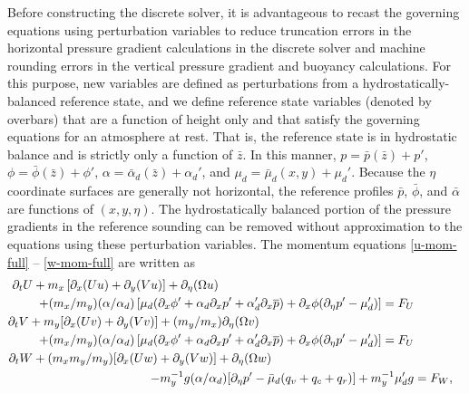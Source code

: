 Before constructing the discrete solver, it is advantageous to recast
the governing equations using perturbation variables to reduce
truncation errors in the horizontal pressure gradient calculations in
the discrete solver and machine rounding errors in
the vertical pressure gradient and buoyancy calculations.  
For this purpose, new
variables are defined as perturbations from a hydrostatically-balanced 
reference state, and we define reference state
variables (denoted by overbars) that are a function of height only and
that satisfy the governing equations for an atmosphere at rest.  That is,
the reference state is in hydrostatic balance and is strictly only a
function of $\bar z$.  In this manner, $p=\bar p(\bar z)+p'$, $\phi=\bar
\phi(\bar z)
+\phi'$, $\alpha=\bar \alpha_d(\bar z) +\alpha_d'$, and $\mu_d = \bar\mu_d(x,y) +
\mu_d'$. Because the $\eta$ coordinate surfaces are generally not
horizontal, the reference profiles $\bar p$, $\bar\phi$, and
$\bar\alpha$ are functions of $(x,y,\eta)$. 
The hydrostatically balanced portion of the pressure gradients in the
reference sounding can be removed without approximation to the equations
using these perturbation variables.
The momentum equations 
\eqref{u-mom-full} -- \eqref{w-mom-full} are written as
%
\begin{align}
\partial_t U + m_x\left[\partial_x(Uu) + \partial_y(Vu)\right] + \partial_\eta (\Omega u) ~~~~~~~~ ~~~~~~~~ ~~~~~~~~ ~~~~~~~~ ~~~~~~~ ~~~~~~~ ~~ \notag &
\hphantom{(m_y/m_x)}
\\
+(m_x/m_y) (\alpha/\alpha_d) \left[ \mu_d (\partial_x \phi' + \alpha_d \partial_x p' + \alpha'_d \partial_x \overline{p}) +
\partial_x \phi (\partial_\eta p' - \mu'_d)\right]  = F_U
\label{u-mom-pert}
\\
%
\partial_t V + m_y[\partial_x (Uv) + \partial_y (Vv)] + (m_y/m_x) \partial_\eta (\Omega v) ~~~~~~~~ ~~~~~~~~ ~~~~~~~~ ~~~~~~~~ ~~~~~~ \notag &
\\
+(m_x/m_y) (\alpha/\alpha_d) \left[ \mu_d (\partial_x \phi' + \alpha_d \partial_x p' + \alpha'_d \partial_x \overline{p}) +
\partial_x \phi (\partial_\eta p' - \mu'_d)\right]  = F_U
\\
%
\partial_t W  + (m_x m_y/m_y) [\partial_x (Uw) + \partial_y (Vw)] + \partial_\eta
(\Omega w)  ~~~~~~~~ ~~~~~~~~ ~~~~~~~~ ~~~~~~~~ ~~~ \notag & 
\\
- m_y^{-1} g (\alpha/\alpha_d) [\partial_\eta p' 
- {\bar{\mu}}_d (q_v + q_c +q_r)]
+ m_y^{-1} {\mu}_d'g
&= F_W,
\label{w-mom-pert}
\end{align}
